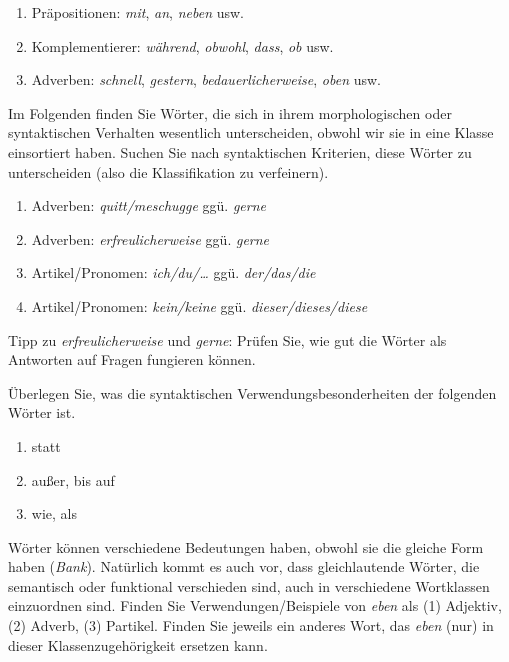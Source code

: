 \begin{enumerate}\Lf
  \item Präpositionen: \textit{mit}, \textit{an}, \textit{neben} usw.
  \item Komplementierer: \textit{während}, \textit{obwohl}, \textit{dass}, \textit{ob} usw.
  \item Adverben: \textit{schnell}, \textit{gestern}, \textit{bedauerlicherweise}, \textit{oben} usw.
\end{enumerate}

\Uebung[\tristar] \label{u52} Im Folgenden finden Sie Wörter, die sich in ihrem morphologischen oder syntaktischen Verhalten wesentlich unterscheiden, obwohl wir sie in eine Klasse einsortiert haben.
Suchen Sie nach syntaktischen Kriterien, diese Wörter zu unterscheiden (also die Klassifikation zu verfeinern).

\begin{enumerate}\Lf
  \item Adverben: \textit{quitt/meschugge} ggü. \textit{gerne}
  \item Adverben: \textit{erfreulicherweise} ggü. \textit{gerne}
  \item Artikel/Pronomen: \textit{ich/du/\ldots} ggü. \textit{der/das/die}
  \item Artikel/Pronomen: \textit{kein/keine} ggü. \textit{dieser/dieses/diese}
\end{enumerate}

Tipp zu \textit{erfreulicherweise} und \textit{gerne}:
Prüfen Sie, wie gut die Wörter als Antworten auf Fragen fungieren können.

\Uebung[\tristar] \label{u53} Überlegen Sie, was die syntaktischen Verwendungsbesonderheiten der folgenden Wörter ist.

\begin{enumerate}\Lf
  \item statt
  \item außer, bis auf
  \item wie, als
\end{enumerate}

\Uebung \label{u54} Wörter können verschiedene Bedeutungen haben, obwohl sie die gleiche Form haben (\zB \textit{Bank}).
Natürlich kommt es auch vor, dass gleichlautende Wörter, die semantisch oder funktional verschieden sind, auch in verschiedene Wortklassen einzuordnen sind.
Finden Sie Verwendungen/Beispiele von \textit{eben} als (1) Adjektiv, (2) Adverb, (3) Partikel.
Finden Sie jeweils ein anderes Wort, das \textit{eben} (nur) in dieser Klassenzugehörigkeit ersetzen kann.

